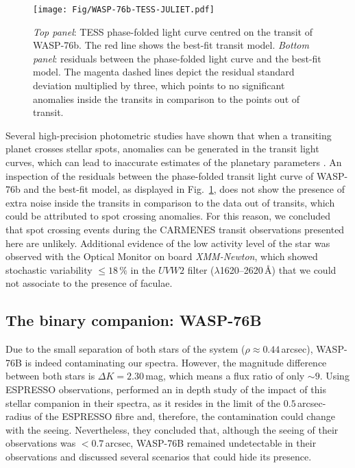 \documentclass{aa}
\begin{document}
\begin{figure}[h]
\centering
\texttt{[image: Fig/WASP-76b-TESS-JULIET.pdf]}
    \caption{{\em Top panel}: TESS phase-folded light curve centred on the transit of WASP-76b. The red line shows the best-fit transit model. {\em Bottom panel}: residuals between the phase-folded light curve and the best-fit model. The magenta dashed lines depict the residual standard deviation multiplied by three, which points to no significant anomalies inside the transits in comparison to the points out of transit.}
\label{fig:PDC-FIT}
\end{figure}


Several high-precision photometric studies have shown that when a transiting planet crosses stellar spots, anomalies can be generated in the transit light curves, which can lead to inaccurate estimates of the planetary parameters \citep[e.g.][]{Czesla-09, Nutzman-11, Sanchis-Ojeda-11a, Sanchis-Ojeda-11b, Oshagh-13, Ioannidis-16}. An inspection of the residuals between the phase-folded transit light curve of WASP-76b and the best-fit model, as displayed in Fig.~\ref{fig:PDC-FIT}, does not show the presence of extra noise inside the transits in comparison to the data out of transits, which could be attributed to spot crossing anomalies. For this reason, we concluded that spot crossing events during the CARMENES transit observations presented here are unlikely. Additional evidence of the low activity level of the star was observed with the Optical Monitor on board {\em XMM-Newton}, which showed stochastic variability $\leq 18\,\%$ in the $UVW2$ filter ($\lambda$1620--2620\,{\AA}) that we could not associate to the presence of faculae.





\subsection{The binary companion: WASP-76B} \label{sec:companion}

Due to the small separation of both stars of the system ($\rho \approx 0.44$\,arcsec), WASP-76B is indeed contaminating our spectra. However, the magnitude difference between both stars is $\Delta K = 2.30$\,mag, which means a flux ratio of only $\sim9$. Using ESPRESSO observations, \citet{Ehrenreich2020} performed an in depth study of the impact of this stellar companion in their spectra, as it resides in the limit of the $0.5$\,arcsec-radius of the ESPRESSO fibre \citep{Pepe2020} and, therefore, the contamination could change with the seeing. Nevertheless, they concluded that, although the seeing of their observations was $<0.7$\,arcsec, WASP-76B remained undetectable in their observations and discussed several scenarios that could hide its presence.
\end{document}
